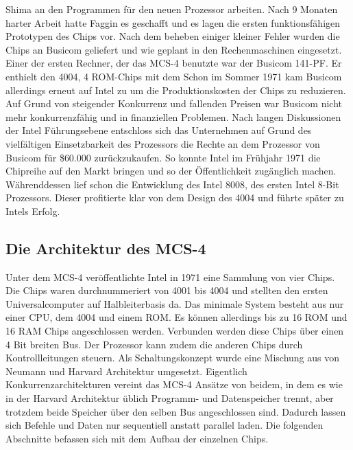 Shima an den Programmen für den neuen Prozessor arbeiten.
Nach 9 Monaten harter Arbeit hatte Faggin es geschafft und es lagen die ersten funktionsfähigen Prototypen des Chips vor.
Nach dem beheben einiger kleiner Fehler wurden die Chips an Busicom geliefert und wie geplant in den Rechenmaschinen eingesetzt. Einer der ersten Rechner, der das MCS-4 benutzte war der Busicom 141-PF. Er enthielt den 4004, 4 ROM-Chips mit dem Schon im Sommer 1971 kam
 Busicom allerdings erneut auf Intel zu um die Produktionskosten der Chips zu reduzieren. Auf Grund von steigender Konkurrenz und fallenden Preisen war Busicom nicht mehr konkurrenzfähig und in finanziellen Problemen. Nach langen Diskussionen der Intel Führungsebene entschloss sich das Unternehmen auf Grund des vielfältigen Einsetzbarkeit des Prozessors die Rechte an dem Prozessor von Busicom für {\$}60.000 zurückzukaufen. So konnte Intel im Frühjahr 1971 die Chipreihe auf den Markt bringen und so der Öffentlichkeit zugänglich machen. Währenddessen lief schon die Entwicklung des Intel 8008, des ersten Intel 8-Bit Prozessors. Dieser profitierte klar von dem Design des 4004 und führte später zu Intels Erfolg.
 
\subsection{Die Architektur des MCS-4}
Unter dem MCS-4 veröffentlichte Intel in 1971 eine Sammlung von vier Chips. Die Chips waren durchnummeriert von 4001 bis 4004 und stellten den ersten Universalcomputer auf Halbleiterbasis da. Das minimale System besteht aus nur einer CPU, dem 4004 und einem ROM. Es können allerdings bis zu 16 ROM und 16 RAM Chips angeschlossen werden. Verbunden werden diese Chips über einen 4 Bit breiten Bus. Der Prozessor kann zudem die anderen Chips durch Kontrollleitungen steuern. Als Schaltungskonzept wurde eine Mischung aus von Neumann und Harvard Architektur umgesetzt. Eigentlich Konkurrenzarchitekturen vereint das MCS-4 Ansätze von beidem, in dem es wie in der Harvard Architektur üblich Programm- und Datenspeicher trennt, aber trotzdem beide Speicher über den selben Bus angeschlossen sind. Dadurch lassen sich Befehle und Daten nur sequentiell anstatt parallel laden. Die folgenden Abschnitte befassen sich mit dem Aufbau der einzelnen Chips.

